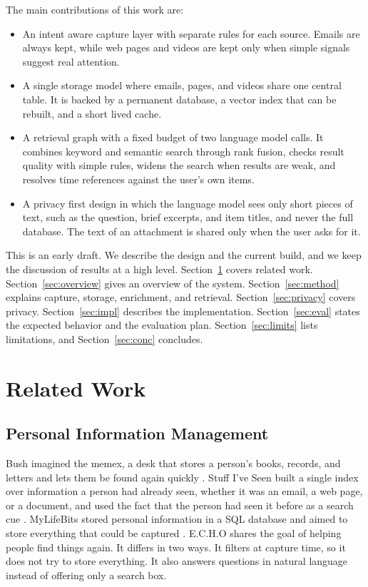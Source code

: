 \documentclass[conference]{IEEEtran}
\begin{document}
The main contributions of this work are:
\begin{itemize}
\item An intent aware capture layer with separate rules for each source. Emails are always kept, while web pages and videos are kept only when simple signals suggest real attention.
\item A single storage model where emails, pages, and videos share one central table. It is backed by a permanent database, a vector index that can be rebuilt, and a short lived cache.
\item A retrieval graph with a fixed budget of two language model calls. It combines keyword and semantic search through rank fusion, checks result quality with simple rules, widens the search when results are weak, and resolves time references against the user's own items.
\item A privacy first design in which the language model sees only short pieces of text, such as the question, brief excerpts, and item titles, and never the full database. The text of an attachment is shared only when the user asks for it.
\end{itemize}

This is an early draft. We describe the design and the current build, and we keep the discussion of results at a high level. Section~\ref{sec:related} covers related work. Section~\ref{sec:overview} gives an overview of the system. Section~\ref{sec:method} explains capture, storage, enrichment, and retrieval. Section~\ref{sec:privacy} covers privacy. Section~\ref{sec:impl} describes the implementation. Section~\ref{sec:eval} states the expected behavior and the evaluation plan. Section~\ref{sec:limits} lists limitations, and Section~\ref{sec:conc} concludes.

\section{Related Work}\label{sec:related}
\subsection{Personal Information Management}
Bush imagined the memex, a desk that stores a person's books, records, and letters and lets them be found again quickly \cite{b1}. Stuff I've Seen built a single index over information a person had already seen, whether it was an email, a web page, or a document, and used the fact that the person had seen it before as a search cue \cite{b2}. MyLifeBits stored personal information in a SQL database and aimed to store everything that could be captured \cite{b3}. E.C.H.O shares the goal of helping people find things again. It differs in two ways. It filters at capture time, so it does not try to store everything. It also answers questions in natural language instead of offering only a search box.
\end{document}
